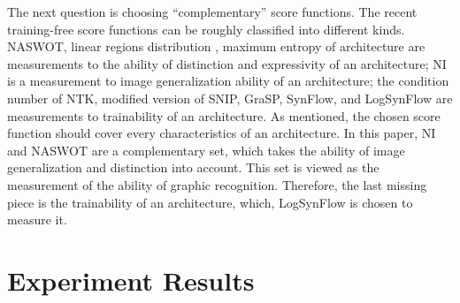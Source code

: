 \documentclass[sigconf]{acmart}
\begin{document}
    The next question is choosing ``complementary'' score functions. The recent training-free 
    score functions can be roughly classified into different kinds. NASWOT, 
    linear regions distribution \cite{https://doi.org/10.48550/arxiv.2102.11535} \cite{lin2021zennas}, 
    maximum entropy of architecture \cite{sun2022maedet} are measurements 
    to the ability of distinction and expressivity of an architecture; 
    NI is a measurement to image generalization ability of an architecture; 
    the condition number of NTK, modified version of SNIP, GraSP, SynFlow, and 
    LogSynFlow are measurements to trainability of an architecture. 
    As mentioned, the chosen score function should cover every characteristics 
    of an architecture. In this paper, NI and NASWOT are a complementary set, 
    which takes the ability of image generalization and distinction into account. 
    This set is viewed as the measurement of the ability of graphic 
    recognition. Therefore, the last missing piece is the trainability of an 
    architecture, which, LogSynFlow is chosen to measure it. 

    \section{Experiment Results}
    \label{sec:results}
\end{document}

